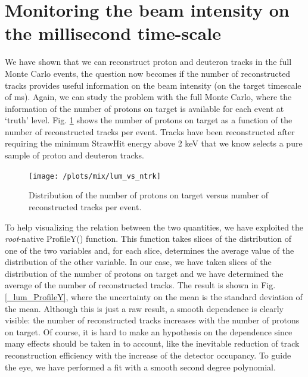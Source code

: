 \documentclass[12pt,a4paper,openright, oneside, titlepage]{book} %
\begin{document}
\section{Monitoring the beam intensity on the millisecond time-scale}
We have shown that we can reconstruct proton and deuteron tracks in the full Monte Carlo events, the question now becomes if the number of reconstructed tracks provides useful information on the beam intensity (on the target timescale of ms). 
Again, we can study the problem with the full Monte Carlo, where the information of the number of protons on target is available for each event at `truth' level.
Fig. \ref{_lum_vs_ntrk} shows the number of protons on target as a function of the number of reconstructed tracks per event. 
Tracks have been reconstructed after requiring the minimum StrawHit energy above 2 keV that we know selects a pure sample of proton and deuteron tracks.

\begin{figure}[!htb]
\centering
\texttt{[image: /plots/mix/lum\_vs\_ntrk]}
\caption[Protons on target and number of tracks]
{Distribution of the number of protons on target versus number of reconstructed tracks per event.}
\label{_lum_vs_ntrk}
\end{figure}

\noindent To help visualizing the relation between the two quantities, we have exploited the \textit{root}-native ProfileY() function. 
This function takes slices of the distribution of one of the two variables and, for each slice, determines the average value of the distribution of the other variable. 
In our case, we have taken slices of the distribution of the number of protons on target and we have determined the average of the number of reconstructed tracks. 
The result is shown in Fig. \ref{_lum_ProfileY}, where the uncertainty on the mean is the standard deviation of the mean.
Although this is just a raw result, a smooth dependence is clearly visible: the number of reconstructed tracks increases with the number of protons on target. 
Of course, it is hard to make an hypothesis on the dependence since many effects should be taken in to account, like the inevitable reduction of track reconstruction efficiency with the increase of the detector occupancy.
To guide the eye, we have performed a fit with a smooth second degree polynomial.\\
\end{document}
